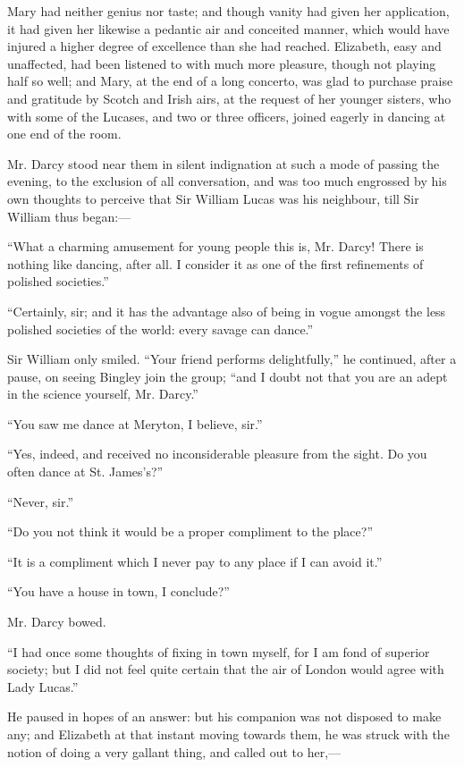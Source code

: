 Mary had neither genius nor taste; and though vanity had given her application, it had given her likewise a pedantic air and conceited manner, which would have injured a higher degree of excellence than she had reached. Elizabeth, easy and unaffected, had been listened to with much more pleasure, though not playing half so well; and Mary, at the end of a long concerto, was glad to purchase praise and gratitude by Scotch and Irish airs, at the request of her younger sisters, who with some of the Lucases, and two or three officers, joined eagerly in dancing at one end of the room.

Mr. Darcy stood near them in silent indignation at such a mode of passing the evening, to the exclusion of all conversation, and was too much engrossed by his own thoughts to perceive that Sir William Lucas was his neighbour, till Sir William thus began:---

``What a charming amusement for young people this is, Mr. Darcy! There is nothing like dancing, after all. I consider it as one of the first refinements of polished societies.''

``Certainly, sir; and it has the advantage also of being in vogue amongst the less polished societies of the world: every savage can dance.''

Sir William only smiled. ``Your friend performs delightfully,'' he continued, after a pause, on seeing Bingley join the group; ``and I doubt not that you are an adept in the science yourself, Mr. Darcy.''

``You saw me dance at Meryton, I believe, sir.''

``Yes, indeed, and received no inconsiderable pleasure from the sight. Do you often dance at St. James's?''

``Never, sir.''

``Do you not think it would be a proper compliment to the place?''

``It is a compliment which I never pay to any place if I can avoid it.''

``You have a house in town, I conclude?''

Mr. Darcy bowed.

``I had once some thoughts of fixing in town myself, for I am fond of superior society; but I did not feel quite certain that the air of London would agree with Lady Lucas.''

He paused in hopes of an answer: but his companion was not disposed to make any; and Elizabeth at that instant moving towards them, he was struck with the notion of doing a very gallant thing, and called out to her,---

